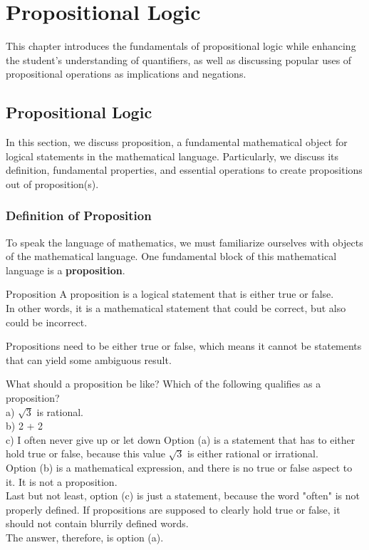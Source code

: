 \chapter{Propositional Logic}
This chapter introduces the fundamentals of propositional logic while enhancing the student's understanding of quantifiers, as well as discussing popular uses of propositional operations as implications and negations.

\section{Propositional Logic}
In this section, we discuss proposition, a fundamental mathematical object for logical statements in the mathematical language. Particularly, we discuss its definition, fundamental properties, and essential operations to create propositions out of proposition(s).

\subsection{Definition of Proposition}
To speak the language of mathematics, we must familiarize ourselves with objects of the mathematical language. One fundamental block of this mathematical language is a \textbf{proposition}.
\begin{ln-define}{Proposition}{}
    A proposition is a logical statement that is either true or false. \\
    In other words, it is a mathematical statement that could be correct, but also could be incorrect.
\end{ln-define}
Propositions need to be either true or false, which means it cannot be statements that can yield some ambiguous result.
\begin{ln-think}{What should a proposition be like?}{}
    Which of the following qualifies as a proposition? \\
    a) $\sqrt{3}$ is rational. \\
    b) 2 + 2 \\
    c) I often never give up or let down
    \tcblower
    Option (a) is a statement that has to either hold true or false, because this value $\sqrt{3}$ is either rational or irrational. \\
    Option (b) is a mathematical expression, and there is no true or false aspect to it. It is not a proposition. \\
    Last but not least, option (c) is just a statement, because the word "often" is not properly defined. If propositions are supposed to clearly hold true or false, it should not contain blurrily defined words. \\
    The answer, therefore, is option (a).
\end{ln-think}

